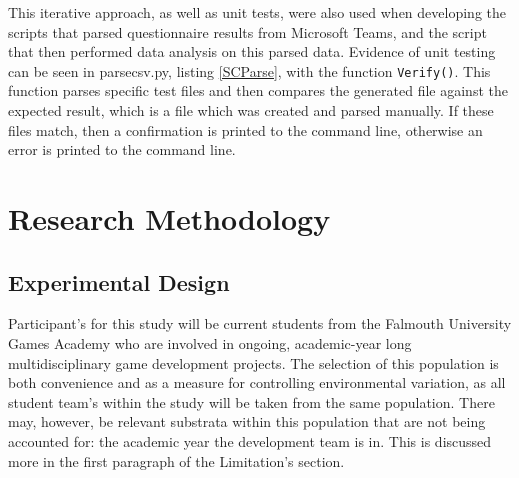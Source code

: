 \documentclass[journal]{IEEEtran}
\begin{document}
This iterative approach, as well as unit tests, were also used when developing the scripts that parsed questionnaire results from Microsoft Teams, and the script that then performed data analysis on this parsed data. Evidence of unit testing can be seen in parsecsv.py, listing \ref{SCParse}, with the function \lstinline{Verify()}. This function parses specific test files and then compares the generated file against the expected result, which is a file which was created and parsed manually. If these files match, then a confirmation is printed to the command line, otherwise an error is printed to the command line.



\section{Research Methodology}
\subsection{Experimental Design}
Participant's for this study will be current students from the Falmouth University Games Academy who are involved in ongoing, academic-year long multidisciplinary game development projects. The selection of this population is both convenience and as a measure for controlling environmental variation, as all student team's within the study will be taken from the same population. There may, however, be relevant substrata within this population that are not being accounted for: the academic year the development team is in. This is discussed more in the first paragraph of the Limitation's section.
\end{document}
